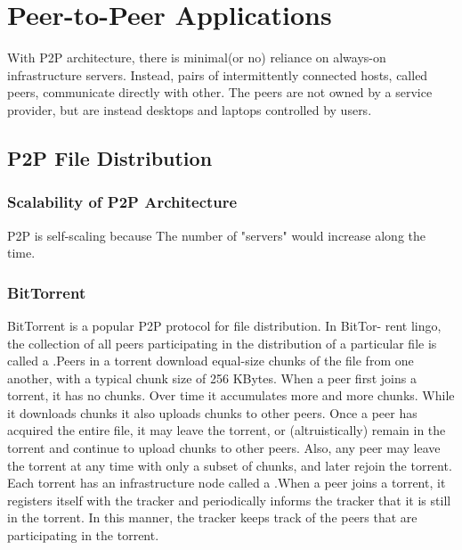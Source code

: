 \newpage
\section{Peer-to-Peer Applications}

\hf With P2P architecture, there is minimal(or no) reliance on always-on infrastructure servers.
Instead, pairs of intermittently connected hosts, called peers, communicate
directly with other. The peers are not owned by a service provider, but are instead desktops and laptops
controlled by users.

\subsection{P2P File Distribution}

\subsubsection{Scalability of P2P Architecture}

\hf P2P is self-scaling because 
The number of "servers" would increase along the time.




\subsubsection{BitTorrent}

\hf BitTorrent is a popular P2P protocol for file distribution. In BitTor-
rent lingo, the collection of all peers participating in the distribution of a particular
file is called a .Peers in a torrent download equal-size chunks of the file
from one another, with a typical chunk size of 256 KBytes. When a peer first joins
a torrent, it has no chunks. Over time it accumulates more and more chunks. While
it downloads chunks it also uploads chunks to other peers. Once a peer has
acquired the entire file, it may leave the torrent, or (altruistically) remain
in the torrent and continue to upload chunks to other peers. Also, any peer may leave
the torrent at any time with only a subset of chunks, and later rejoin the torrent.\\
Each torrent has an infrastructure node called a .When a peer joins a torrent, it registers itself with the tracker and periodically
informs the tracker that it is still in the torrent. In this manner, the tracker keeps
track of the peers that are participating in the torrent.\\



